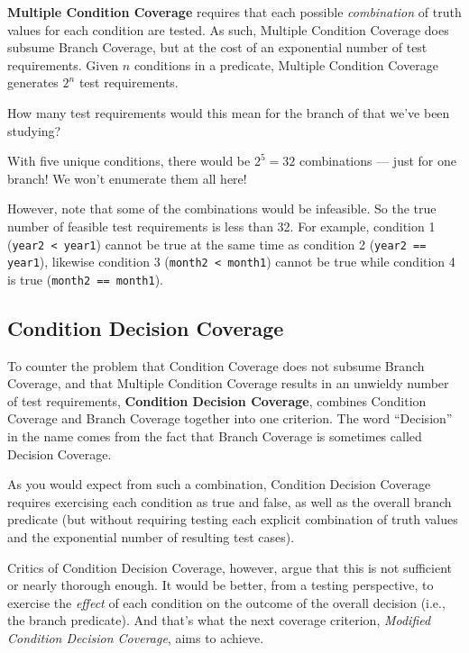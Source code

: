 {\bf Multiple Condition Coverage} requires that each possible {\it combination}
of truth values for each condition are tested. As such, Multiple Condition
Coverage does subsume Branch Coverage, but at the cost of an exponential number
of test requirements. 
%
Given $n$ conditions in a predicate, Multiple Condition Coverage generates $2^n$
test requirements. 


How many test requirements would this mean for the branch of
\daysbetweentwodatesmethod that we've been studying?


With five unique conditions, there would be $2^5 = 32$ combinations --- just for
one branch! 
%
We won't enumerate them all here!

However, note that some of the combinations would be infeasible. So the true
number of feasible test requirements is less than 32. For example, condition 1
({\tt year2 < year1}) cannot be true at the same time as condition 2 ({\tt year2
== year1}), likewise condition 3 ({\tt month2 < month1}) cannot be true while
condition 4 is true ({\tt month2 == month1}). 


\subsection{Condition Decision Coverage}

To counter the problem that Condition Coverage does not subsume Branch Coverage,
and that Multiple Condition Coverage results in an unwieldy number of test
requirements, {\bf Condition Decision Coverage}, combines Condition Coverage and
Branch Coverage together into one criterion. The word ``Decision'' in the name
comes from the fact that Branch Coverage is sometimes called Decision Coverage.

As you would expect from such a combination, Condition Decision Coverage
requires exercising each condition as true and false, as well as the overall
branch predicate (but without requiring testing each explicit combination of
truth values and the exponential number of resulting test cases).

Critics of Condition Decision Coverage, however, argue that this is not
sufficient or nearly thorough enough. It would be better, from a testing
perspective, to exercise the {\it effect} of each condition on the outcome of
the overall decision (i.e., the branch predicate). And that's what the next
coverage criterion, {\it Modified Condition Decision Coverage}, aims to achieve.

